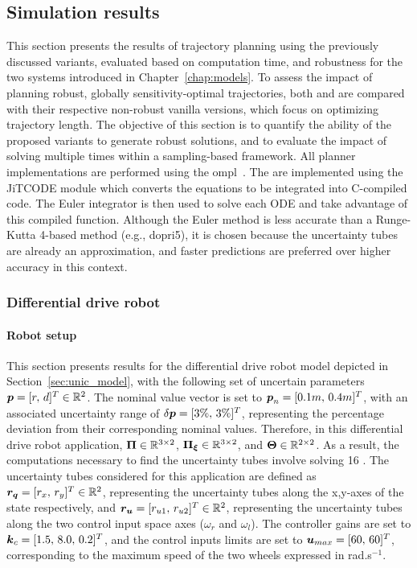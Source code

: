 \subsection{Simulation results}\label{sec:samp_simu}

This section presents the results of trajectory planning using the previously discussed variants, evaluated based on computation time, and robustness for the two systems introduced in Chapter~\ref{chap:models}.
To assess the impact of planning robust, globally sensitivity-optimal trajectories, both  and  are compared with their respective non-robust vanilla versions, which focus on optimizing trajectory length.
The objective of this section is to quantify the ability of the proposed variants to generate robust solutions, and to evaluate the impact of solving  multiple times within a sampling-based framework.
All planner implementations are performed using the \gls{ompl}~\cite{cOMPL}.
The  are implemented using the JiTCODE \cite{cJit} module which converts the equations to be integrated into C-compiled code.
The Euler integrator is then used to solve each ODE and take advantage of this compiled function.
Although the Euler method is less accurate than a Runge-Kutta 4-based method (e.g., dopri5),  it is chosen because the uncertainty tubes are already an approximation, and faster predictions are preferred over higher accuracy in this context.

\subsubsection{Differential drive robot}

\paragraph{Robot setup}

This section presents results for the differential drive robot model depicted in Section~\ref{sec:unic_model}, with the following set of uncertain parameters $\boldsymbol{p} = [r, \, d]^T \in \mathbb{R}^{2}$.
The nominal value vector is set to $\boldsymbol{p}_n = [0.1m, \, 0.4m]^T$, with an associated uncertainty range of $\delta\boldsymbol{p} = [3\%, \, 3\%]^T$, representing the percentage deviation from their corresponding nominal values.
Therefore, in this differential drive robot application, $\boldsymbol{\Pi} \in \mathbb{R}^{3\times2}$, $\boldsymbol{\Pi_{\xi}}\in \mathbb{R}^{3\times2}$, and $\boldsymbol{\Theta} \in \mathbb{R}^{2\times2}$.
As a result, the computations necessary to find the uncertainty tubes involve solving 16 .
The uncertainty tubes considered for this application are defined as $\boldsymbol{r_q} = [r_x, \, r_y]^T \in \mathbb{R}^2$, representing the uncertainty tubes along the x,y-axes of the state respectively, and $\boldsymbol{r_u} = [r_{u1}, \, r_{u2}]^T \in \mathbb{R}^2$, representing the uncertainty tubes along the two control input space axes ($\omega_r$ and $\omega_l$).
The controller gains are set to $\boldsymbol{k}_c = [1.5, \, 8.0, \, 0.2]^T$, and the control inputs limits are set to $\boldsymbol{u}_{max} = [60, \, 60]^T$, corresponding to the maximum speed of the two wheels expressed in rad.s$^{-1}$.

